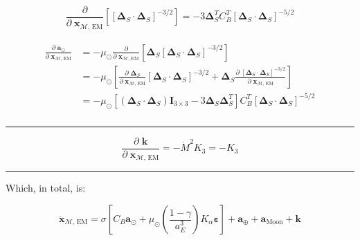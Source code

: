 \documentclass[]{article}
\newcommand{\pd}[2]{\frac{\partial\;#1}{\partial\;#2}}
\newcommand{\pddown}[2]{\frac{\partial}{\partial\;#2} \left[ #1 \right] }
\begin{document}
	\begin{equation*}
		\pddown{ [\boldsymbol{\Delta}_S \cdot \boldsymbol{\Delta}_S]^{-3/2} }{\mathbf{x}_{\mathcal{M}\text{, EM}}} = -3 \boldsymbol{\Delta}_S^T C_B^T [\boldsymbol{\Delta}_S \cdot \boldsymbol{\Delta}_S]^{-5/2}
	\end{equation*}
	
	\begin{align}
	\begin{split}
		\pd{\mathbf{a}_{\odot}}{ \mathbf{x}_{\mathcal{M}\text{, EM}} } 
		&= -\mu_\odot \pddown{ \boldsymbol{\Delta}_S [\boldsymbol{\Delta}_S\cdot\boldsymbol{\Delta}_S]^{-3/2} }{ \mathbf{x}_{\mathcal{M}\text{, EM}} } \\
		&= -\mu_\odot \left[ \pd{ \boldsymbol{\Delta}_S}{ \mathbf{x}_{\mathcal{M}\text{, EM}} }[\boldsymbol{\Delta}_S\cdot\boldsymbol{\Delta}_S]^{-3/2} + \boldsymbol{\Delta}_S \pd{ [\boldsymbol{\Delta}_S\cdot\boldsymbol{\Delta}_S]^{-3/2} }{ \mathbf{x}_{\mathcal{M}\text{, EM}} } \right] \\
		&= -\mu_\odot \left[ (\boldsymbol{\Delta}_S\cdot\boldsymbol{\Delta}_S) \mathbf{I}_{3\times 3} - 3 \boldsymbol{\Delta}_S \boldsymbol{\Delta}_S^T \right] C_B^T [\boldsymbol{\Delta}_S \cdot \boldsymbol{\Delta}_S]^{-5/2} \\
	\end{split}
	\end{align}
	
	\hrule \vspace{1em}
	
	\begin{equation*}
		\pd{\mathbf{k}}{ \mathbf{x}_{\mathcal{M}\text{, EM}} } = - \dot{M}^2 K_3 = -K_3
	\end{equation*}
	
	\hrule \vspace{1em}
	
	Which, in total, is:
	
	\begin{equation}
		\ddot{\mathbf{x}}_{\mathcal{M}\text{, EM}} = \sigma \left[ C_B  \mathbf{a}_{\odot} + \mu_\odot \left(\frac{1-\gamma}{a_E^3}\right) K_\alpha \boldsymbol{\varepsilon} \right] + \mathbf{a}_\oplus +  \mathbf{a}_\text{Moon}  + \mathbf{k}
	\end{equation}
	
\end{document}
